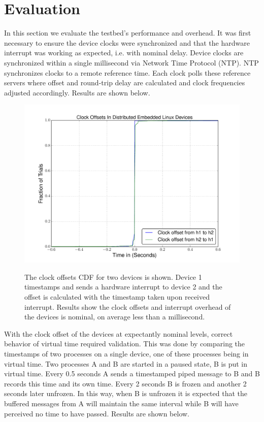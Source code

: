 \section{Evaluation}
In this section we evaluate the testbed's performance and overhead. It was first necessary to ensure the device clocks were synchronized and that the hardware interrupt was working as expected, i.e. with nominal delay. Device clocks are synchronized  within a single millisecond via Network Time Protocol (NTP). NTP synchronizes clocks to a remote reference time. Each clock polls these reference servers where offset and round-trip delay are calculated and clock frequencies adjusted accordingly. Results are shown below.

\begin{figure}[H]
  \includegraphics[scale=0.25]{clock_offset_cdf.pdf}
  \label{sim-err}

  \caption{The clock offsets CDF for two devices is shown. Device 1 timestamps and sends a hardware interrupt to device 2 and the offset is calculated with the timestamp taken upon received interrupt. Results show the clock offsets and interrupt overhead of the devices is nominal, on average less than a millisecond.
    }
\end{figure}

With the clock offset of the devices at expectantly nominal levels, correct behavior of virtual time required validation. This was done by comparing the timestamps of two processes on a single device, one of these processes being in virtual time. Two processes A and B are started in a paused state, B is put in virtual time. Every 0.5 seconds A sends a timestamped piped message to B and B records this time and its own time. Every 2 seconds B is frozen and another 2 seconds later unfrozen. In this way, when B is unfrozen it is expected that the buffered messages from A will maintain the same interval while B will have perceived no time to have passed. Results are shown below.

